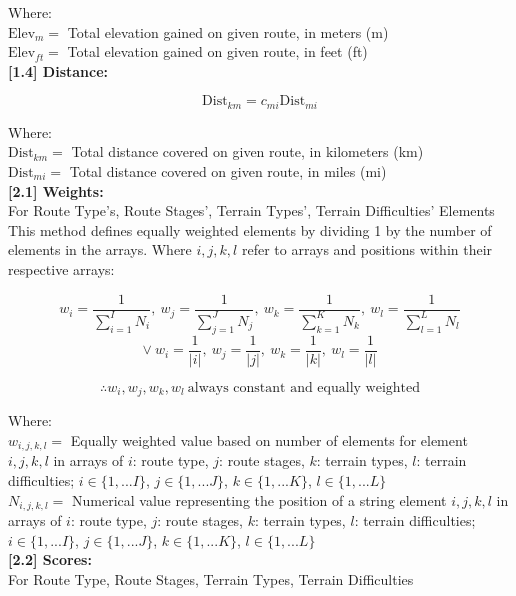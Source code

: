 \documentclass[11pt, english]{article}
\begin{document}
	Where:\\
	$\mathrm{Elev}_{m}=$ Total elevation gained on given route, in meters (m)\\
	$\mathrm{Elev}_{ft}=$ Total elevation gained on given route, in feet (ft)\\

	\textbf{[1.4] Distance:}

	$$\mathrm{Dist}_{km}=c_{mi}\mathrm{Dist}_{mi}$$

	Where:\\
	$\mathrm{Dist}_{km}=$ Total distance covered on given route, in kilometers (km)\\
	$\mathrm{Dist}_{mi}=$ Total distance covered on given route, in miles (mi)\\

	\textbf{[2.1] Weights:}\\

	For Route Type's, Route Stages', Terrain Types', Terrain Difficulties' Elements\\

	This method defines equally weighted elements by dividing 1 by the number of elements in the arrays. Where $i,j,k,l$ refer to arrays and positions within their respective arrays:

	$$w_{i}=\frac{1}{\sum^{I}_{i=1}N_{i}},\ w_{j}=\frac{1}{\sum^{J}_{j=1}N_{j}},\ w_{k}=\frac{1}{\sum^{K}_{k=1}N_{k}},\ w_{l}=\frac{1}{\sum^{L}_{l=1}N_{l}}$$
	$$\lor\ w_{i}=\frac{1}{\vert i\vert},\ w_{j}=\frac{1}{\vert j\vert},\ w_{k}=\frac{1}{\vert k\vert},\ w_{l}=\frac{1}{\vert l\vert}$$

	$$\therefore w_{i}, w_{j}, w_{k}, w_{l}\ \textrm{always constant and equally weighted}$$

	Where:\\
	$w_{i,j,k,l}=$ Equally weighted value based on number of elements for element $i,j,k,l$ in arrays of $i$: route type, $j$: route stages, $k$: terrain types, $l$: terrain difficulties; $i\in\{1,...I\}$, $j\in\{1,...J\}$, $k\in\{1,...K\}$, $l\in\{1,...L\}$\\
	$N_{i,j,k,l}=$ Numerical value representing the position of a string element $i,j,k,l$ in arrays of $i$: route type, $j$: route stages, $k$: terrain types, $l$: terrain difficulties; $i\in\{1,...I\}$, $j\in\{1,...J\}$, $k\in\{1,...K\}$, $l\in\{1,...L\}$\\

	\textbf{[2.2] Scores:}\\

	For Route Type, Route Stages, Terrain Types, Terrain Difficulties
\end{document}
